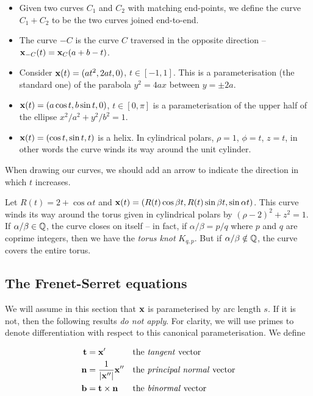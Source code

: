 \documentclass{../../template/note}
\begin{document}
    \begin{itemize}
        \item Given two curves \(C_1\) and \(C_2\) with matching end-points, we define the curve \(C_1 + C_2\) to be the two curves joined end-to-end.
        \item The curve \(-C\) is the curve \(C\) traversed in the opposite direction -- \(\V x_{-C}(t) = \V x_C(a+b-t)\).
    \end{itemize}
    
    \begin{example*}
        \begin{itemize}
            \item Consider \(\V x(t) = (at^2, 2at, 0)\), \(t \in [-1, 1]\). This is a parameterisation (the standard one) of the parabola \(y^2=4ax\) between \(y= \pm 2a\).
            \item \(\V x(t) = (a \cos t, b \sin t, 0)\), \(t \in [0, \pi]\) is a parameterisation of the upper half of the ellipse \(x^2/a^2+y^2/b^2=1\).
            \item \(\V x(t) = (\cos t, \sin t, t)\) is a helix. In cylindrical polars, \(\rho = 1\), \(\phi = t\), \(z = t\), in other words the curve winds its way around the unit cylinder.
        \end{itemize}
        When drawing our curves, we should add an arrow to indicate the direction in which \(t\) increases.
    \end{example*}
    
    \begin{example*}
        Let \(R(t) = 2 + \cos \alpha t\) and \(\V x(t) = (R(t) \cos \beta t, R(t) \sin \beta t, \sin \alpha t)\). This curve winds its way around the torus given in cylindrical polars by \((\rho-2)^2 + z^2 = 1\). If \(\alpha/\beta \in \mathbb Q\), the curve closes on itself -- in fact, if \(\alpha/\beta = p/q\) where \(p\) and \(q\) are coprime integers, then we have the \emph{torus knot} \(K_{q, p}\). But if \(\alpha/\beta \notin \mathbb Q\), the curve covers the entire torus.
    \end{example*}
    
    \subsection{The Frenet-Serret equations}

    We will assume in this section that \(\V x\) is parameterised by arc length \(s\). If it is not, then the following results \emph{do not apply}. For clarity, we will use primes to denote differentiation with respect to this canonical parameterisation. We define
    \begin{proposition}
        \begin{align*}
            \V t &= \V x' && \text{the \emph{tangent} vector} \\
            \V n &= \frac 1 {|\V x''|}\V x'' && \text{the \emph{principal normal} vector} \\
            \V b &= \V t \times \V n && \text{the \emph{binormal} vector}
        \end{align*}
    \end{proposition}
\end{document}
